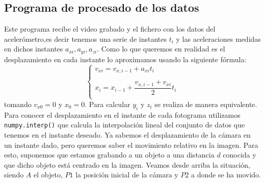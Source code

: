 \documentclass[a4paper,openright, 12pt]{book}
\begin{document}
\subsection{Programa de procesado de los datos}
Este programa recibe el video grabado y el fichero con los datos del acelerómetro,es decir tenemos una serie de instantes $t_i$ y las aceleraciones medidas en dichos instantes $a_{xi}, a_{yi}, a_{zi}$.
Como lo que queremos en realidad es el desplazamiento en cada instante lo aproximamos usando la siguiente fórmula:
\begin{equation}
\left\{ \begin{array}{lcc}
             v_{xi} = v_{x,i-1} + a_{xi}t_i \\
             \\ x_i = x_{i-1} + \dfrac{v_{x,i-1} + v_{xi}}{2} t_i \\
             \end{array}
   \right.
\end{equation}
tomando $v_{x0}=0$ y $x_0=0$.
Para calcular $y_i$ y $z_i$ se realiza de manera equivalente.
\newline
Para conocer el desplazamiento en el instante de cada fotograma utilizamos \lstinline|numpy.interp()| que calcula la interpolación lineal del conjunto de datos que tenemos en el instante deseado. Ya sabemos el desplazamiento de la cámara en un instante dado, pero queremos saber el movimiento relativo en la imagen. Para esto, suponemos que estamos grabando a un objeto a una distancia $d$ conocida y que dicho objeto está centrado en la imagen.
Veamos desde arriba la situación, siendo $A$ el objeto, $P1$ la posición inicial de la cámara y $P2$ a donde se ha movido. 
\end{document}

